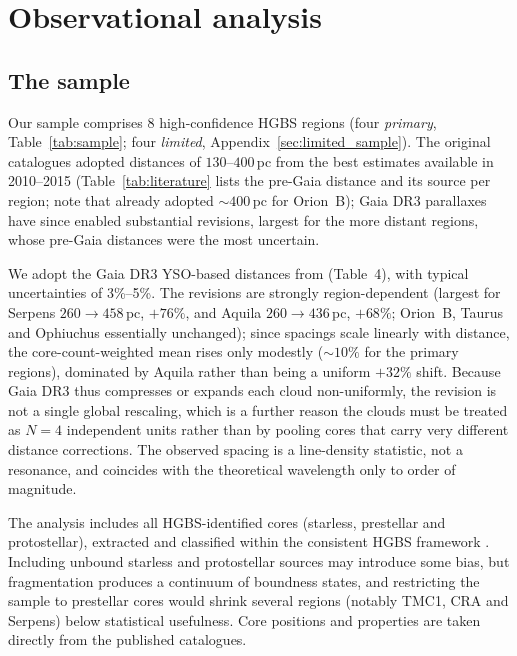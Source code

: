 \documentclass[usenatbib,twoside,twocolumn]{mnras}
\begin{document}
\section{Observational analysis}

\subsection{The sample}

Our sample comprises 8 high-confidence HGBS regions (four \emph{primary}, Table~\ref{tab:sample}; four \emph{limited}, Appendix~\ref{sec:limited_sample}). The original catalogues \citep{Konyves2015, Konyves2020, Ladjelate2020, Pezzuto2021} adopted distances of $130$--$400$\,pc from the best estimates available in 2010--2015 (Table~\ref{tab:literature} lists the pre-Gaia distance and its source per region; note that \citealt{Konyves2020} already adopted $\sim400$\,pc for Orion~B); Gaia DR3 parallaxes \citep{Zhang2023} have since enabled substantial revisions, largest for the more distant regions, whose pre-Gaia distances were the most uncertain.

We adopt the Gaia DR3 YSO-based distances from \citet{Zhang2023} (Table~4), with typical uncertainties of 3\%--5\%. The revisions are strongly region-dependent (largest for Serpens $260\to458$\,pc, $+76\%$, and Aquila $260\to436$\,pc, $+68\%$; Orion~B, Taurus and Ophiuchus essentially unchanged); since spacings scale linearly with distance, the core-count-weighted mean rises only modestly ($\sim10\%$ for the primary regions), dominated by Aquila rather than being a uniform $+32\%$ shift. Because Gaia DR3 thus compresses or expands each cloud non-uniformly, the revision is not a single global rescaling, which is a further reason the clouds must be treated as $N=4$ independent units rather than by pooling cores that carry very different distance corrections. The observed spacing is a line-density statistic, not a resonance, and coincides with the theoretical wavelength only to order of magnitude.

The analysis includes all HGBS-identified cores (starless, prestellar and protostellar), extracted and classified within the consistent HGBS framework \citep{Konyves2015, Konyves2020}. Including unbound starless and protostellar sources may introduce some bias, but fragmentation produces a continuum of boundness states, and restricting the sample to prestellar cores would shrink several regions (notably TMC1, CRA and Serpens) below statistical usefulness. Core positions and properties are taken directly from the published catalogues.
\end{document}
